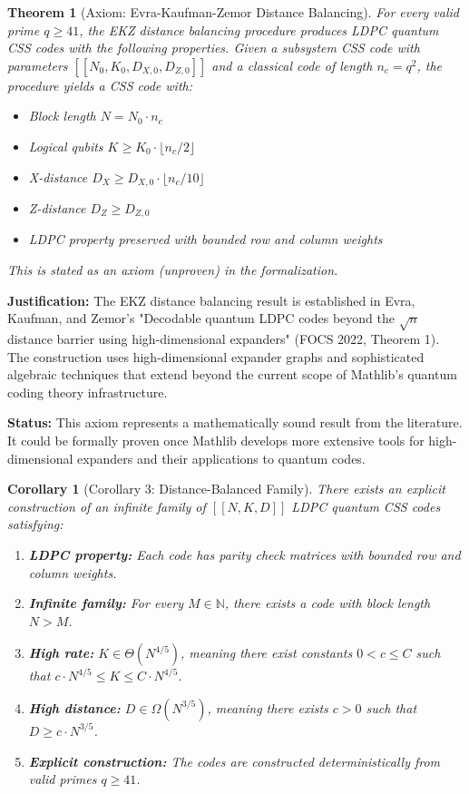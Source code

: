 \documentclass[11pt]{article}
\theoremstyle{plain}
\newtheorem*{theorem}{Theorem}
\newtheorem*{corollary}{Corollary}
\theoremstyle{definition}
\theoremstyle{remark}
\begin{document}
\begin{theorem}[Axiom: Evra-Kaufman-Zemor Distance Balancing]
For every valid prime $q \geq 41$, the EKZ distance balancing procedure produces LDPC quantum CSS codes with the following properties. Given a subsystem CSS code with parameters $[[N_0, K_0, D_{X,0}, D_{Z,0}]]$ and a classical code of length $n_c = q^2$, the procedure yields a CSS code with:
\begin{itemize}
\item Block length $N = N_0 \cdot n_c$
\item Logical qubits $K \geq K_0 \cdot \lfloor n_c/2 \rfloor$  
\item X-distance $D_X \geq D_{X,0} \cdot \lfloor n_c/10 \rfloor$
\item Z-distance $D_Z \geq D_{Z,0}$
\item LDPC property preserved with bounded row and column weights
\end{itemize}

\textit{This is stated as an axiom (unproven) in the formalization.}
\end{theorem}

\textbf{Justification:} The EKZ distance balancing result is established in Evra, Kaufman, and Zemor's "Decodable quantum LDPC codes beyond the $\sqrt{n}$ distance barrier using high-dimensional expanders" (FOCS 2022, Theorem 1). The construction uses high-dimensional expander graphs and sophisticated algebraic techniques that extend beyond the current scope of Mathlib's quantum coding theory infrastructure.

\textbf{Status:} This axiom represents a mathematically sound result from the literature. It could be formally proven once Mathlib develops more extensive tools for high-dimensional expanders and their applications to quantum codes.

\begin{corollary}[Corollary 3: Distance-Balanced Family]
There exists an explicit construction of an infinite family of $[[N, K, D]]$ LDPC quantum CSS codes satisfying:
\begin{enumerate}
\item \textbf{LDPC property:} Each code has parity check matrices with bounded row and column weights.
\item \textbf{Infinite family:} For every $M \in \mathbb{N}$, there exists a code with block length $N > M$.
\item \textbf{High rate:} $K \in \Theta(N^{4/5})$, meaning there exist constants $0 < c \leq C$ such that $c \cdot N^{4/5} \leq K \leq C \cdot N^{4/5}$.
\item \textbf{High distance:} $D \in \Omega(N^{3/5})$, meaning there exists $c > 0$ such that $D \geq c \cdot N^{3/5}$.
\item \textbf{Explicit construction:} The codes are constructed deterministically from valid primes $q \geq 41$.
\end{enumerate}
\end{corollary}
\end{document}
